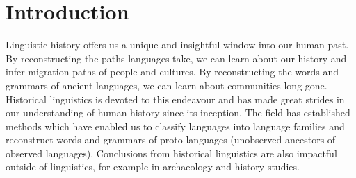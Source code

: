 \documentclass[a4paper,10pt]{article} %
\begin{document}
\begin{abstract}


\end{abstract}
\newpage

\doublespacing
\section{Introduction}
\label{acr:intro}
Linguistic history offers us a unique and insightful window into our human past. By reconstructing the paths languages take, we can learn about our history and infer migration paths of people and cultures. By reconstructing the words and grammars of ancient languages, we can learn about communities long gone. Historical linguistics is devoted to this endeavour and has made great strides in our understanding of human history since its inception. The field has established methods which have enabled us to classify languages into language families and reconstruct words and grammars of proto-languages (unobserved ancestors of observed languages). Conclusions from historical linguistics are also impactful outside of linguistics, for example in archaeology and history studies. %
\end{document}
